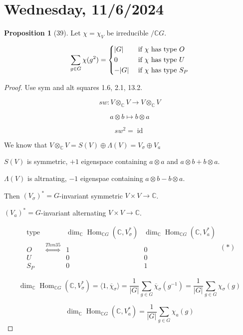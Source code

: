 \documentclass{article}
\theoremstyle{definition}
\newtheorem{proposition}[theorem]{Proposition}
\begin{document}
\section*{Wednesday, 11/6/2024}

\begin{proposition}
    [39] Let \(\chi = \chi_V\) be irreducible \(/ \mathbb{C} G\).

    \[
        \sum_{g\in G} \chi(g^2) = \begin{dcases}
            \vert G \vert & \text{ if \(\chi\) has type } O\\
            0 & \text{ if \(\chi\) has type } U\\
            - \vert G \vert & \text{ if \(\chi\) has type } S_P
        \end{dcases}
    \]
\end{proposition}

\begin{proof}
    Use sym and alt squares 1.6, 2.1, 13.2.

    \[
        sw: V \otimes_\mathbb{C} V \to V \otimes_\mathbb{C} V
    \]

    \[
        a \otimes b \mapsto b \otimes a
    \]

    \[
        sw^2 = \operatorname{id}
    \]

    We know that \(V \otimes_\mathbb{C} V = S(V) \oplus \Lambda(V) = V_\sigma \oplus V_a\) 

    \(S(V)\) is symmetric, \(+1\) eigenspace containing \(a \otimes a\) and \(a \otimes b + b \otimes a\).

    \(\Lambda(V)\) is altrnating, \(-1\) eigenspae containing \(a \otimes b - b \otimes a\).

    Then \((V_\sigma)^{\ast} = G\)-invariant symmetric \(V \times V \to \mathbb{C}\).

    \((V_a)^{\ast} = G\)-invariant alternating \(V \times V \to \mathbb{C}\).


    \[
        \begin{array}{cccc}
            \text{type} &  & \dim_\mathbb{C} \operatorname{Hom}_{\mathbb{C} G}(\mathbb{C} , V_\sigma ^{\ast}) &  \dim_\mathbb{C} \operatorname{Hom}_{\mathbb{C} G}(\mathbb{C} , V_a^{\ast}) \\
            O & \overset{Thm 35}{\iff} & 1 &  0 \\
            U &  & 0 &  0 \\
            S_P & & 0 & 1
        \end{array} \,(\ast)
    \]

    \[
        \dim_\mathbb{C} \operatorname{Hom}_{\mathbb{C} G} (\mathbb{C}, V_\sigma^{\ast}) = \langle 1, \overline{\chi}_\sigma  \rangle = \frac{1}{\vert G \vert} \sum_{g\in G} \overline{\chi}_\sigma (g ^{-1}) = \frac{1}{\vert G \vert} \sum_{g\in G} \chi_\sigma (g)  
    \]

    \[
        \dim_\mathbb{C} \operatorname{Hom}_{\mathbb{C} G}(\mathbb{C}, V_a^{\ast}) = \frac{1}{\vert G \vert} \sum_{g\in G} \chi_a(g)
    \]

\end{proof}
\end{document}
